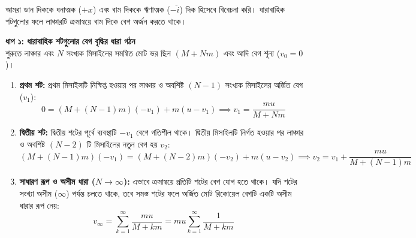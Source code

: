 \documentclass[12pt, a4paper]{article}
\begin{document}
\begin{tcolorbox}[solutionbox={সমাধান (Solution)}]
\noindent
আমরা ডান দিককে ধনাত্মক ($+x$) এবং বাম দিককে ঋণাত্মক ($-\hat{i}$) দিক হিসেবে বিবেচনা করি। ধারাবাহিক শটগুলোর ফলে লাঞ্চারটি ক্রমান্বয়ে বাম দিকে বেগ অর্জন করতে থাকে।

\vspace{0.5em}
\noindent
\textbf{ধাপ ১: ধারাবাহিক শটগুলোর বেগ বৃদ্ধির ধারা গঠন} \\
শুরুতে লাঞ্চার এবং $N$ সংখ্যক মিসাইলের সমন্বিত মোট ভর ছিল $(M + Nm)$ এবং আদি বেগ শূন্য ($v_0 = 0$)।
\begin{enumerate}[leftmargin=*, parsep=0.4ex]
    \item \textbf{প্রথম শট:} প্রথম মিসাইলটি নিক্ষিপ্ত হওয়ার পর লাঞ্চার ও অবশিষ্ট $(N-1)$ সংখ্যক মিসাইলের অর্জিত বেগ ($v_1$):
    \[ 0 = (M + (N-1)m)(-v_1) + m(u - v_1) \implies v_1 = \frac{mu}{M + Nm} \]
    
    \item \textbf{দ্বিতীয় শট:} দ্বিতীয় শটের পূর্বে ব্যবস্থাটি $-v_1$ বেগে গতিশীল থাকে। দ্বিতীয় মিসাইলটি নির্গত হওয়ার পর লাঞ্চার ও অবশিষ্ট $(N-2)$ টি মিসাইলের নতুন বেগ হয় $v_2$:
    \[ (M + (N-1)m)(-v_1) = (M + (N-2)m)(-v_2) + m(u - v_2) \implies v_2 = v_1 + \frac{mu}{M + (N-1)m} \]
    
    \item \textbf{সাধারণ রূপ ও অসীম ধারা ($N \to \infty$):} এভাবে ক্রমান্বয়ে প্রতিটি শটের বেগ যোগ হতে থাকে। যদি শটের সংখ্যা অসীম ($\infty$) পর্যন্ত চলতে থাকে, তবে সমস্ত শটের ফলে অর্জিত মোট রিকোয়েল বেগটি একটি অসীম ধারার রূপ নেয়:
    \[ v_\infty = \sum_{k=1}^{\infty} \frac{mu}{M + km} = mu \sum_{k=1}^{\infty} \frac{1}{M + km} \]
\end{enumerate}

\vspace{1em}
\begin{center}
\end{center}
\end{tcolorbox}
\end{document}
